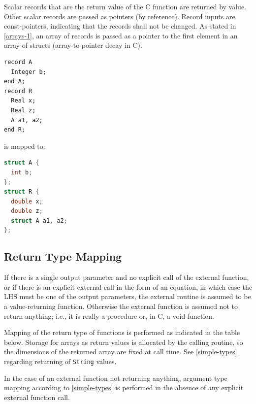 Scalar records that are the return value of the C function are returned by value.
Other scalar records are passed as pointers (by reference).
Record inputs are const-pointers, indicating that the records shall not be changed.
As stated in \cref{arrays-1}, an array of records is passed as a pointer to the first element in an array of structs (array-to-pointer decay in C).

\begin{example}
\begin{lstlisting}[language=modelica]
record A
  Integer b;
end A;
record R
  Real x;
  Real z;
  A a1, a2;
end R;
\end{lstlisting}
is mapped to:
\begin{lstlisting}[language=C]
struct A {
  int b;
};
struct R {
  double x;
  double z;
  struct A a1, a2;
};
\end{lstlisting}
\end{example}

\subsection{Return Type Mapping}\label{return-type-mapping}

If there is a single output parameter and no explicit call of the external function, or if there is an explicit external call in the form of an equation, in which case the LHS must be one of the output parameters, the external routine is assumed to be a value-returning function.
Otherwise the external function is assumed not to return anything; i.e., it is really a procedure or, in C, a void-function.

Mapping of the return type of functions is performed as indicated in the table below.
Storage for arrays as return values is allocated by the calling routine, so the dimensions of the returned array are fixed at call time.
See \cref{simple-types} regarding returning of {\lstinline!String!} values.

\begin{nonnormative}
In the case of an external function not returning anything, argument type mapping according to \cref{simple-types} is performed in the absence of any explicit external function call.
\end{nonnormative}

